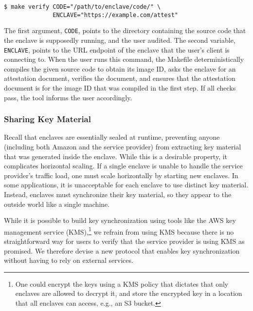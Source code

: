 \begin{lstlisting}[numbers=none,basicstyle=\small\ttfamily]
$ make verify CODE="/path/to/enclave/code/" \
              ENCLAVE="https://example.com/attest"
\end{lstlisting}

The first argument, \texttt{CODE}, points to the directory containing the source
code that the enclave is supposedly running, and the user audited.  The second
variable, \texttt{ENCLAVE}, points to the URL endpoint of the enclave that the
user's client is connecting to.  When the user runs this command, the Makefile
deterministically compiles the given source code to obtain its image ID, asks
the enclave for an attestation document, verifies the document, and ensures that
the attestation document is for the image ID that was compiled in the first
step.  If all checks pass, the tool informs the user accordingly.

\subsubsection{Sharing Key Material}
\label{sec:sync}

Recall that enclaves are essentially sealed at runtime, preventing anyone
(including both Amazon and the service provider) from extracting key material
that was generated inside the enclave.  While this is a desirable property, it
complicates horizontal scaling.  If a single enclave is unable to handle the
service provider's traffic load, one must scale horizontally by starting new
enclaves.  In some applications, it is unacceptable for each enclave to use
distinct key material.  Instead, enclaves must synchronize their key material,
so they appear to the outside world like a single machine.

While it is possible to build key synchronization using tools like the AWS key
management service (KMS),\footnote{One could encrypt the keys using a KMS
policy that dictates that only enclaves are allowed to decrypt it, and store
the encrypted key in a location that all enclaves can access, e.g., an S3
bucket.} we refrain from using KMS because there is no straightforward way for
users to verify that the service provider is using KMS as promised.  We
therefore devise a new protocol that enables key synchronization without having
to rely on external services.


